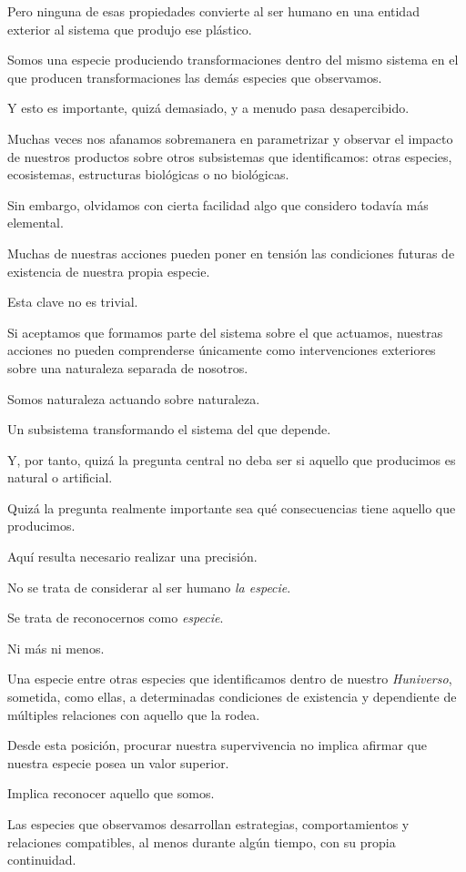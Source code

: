 \documentclass[12pt,a4paper]{article}
\begin{document}
Pero ninguna de esas propiedades convierte al ser humano en una entidad exterior al sistema que produjo ese plástico.

Somos una especie produciendo transformaciones dentro del mismo sistema en el que producen transformaciones las demás especies que observamos.

Y esto es importante, quizá demasiado, y a menudo pasa desapercibido.

Muchas veces nos afanamos sobremanera en parametrizar y observar el impacto de nuestros productos sobre otros subsistemas que identificamos: otras especies, ecosistemas, estructuras biológicas o no biológicas.

Sin embargo, olvidamos con cierta facilidad algo que considero todavía más elemental.

Muchas de nuestras acciones pueden poner en tensión las condiciones futuras de existencia de nuestra propia especie.

Esta clave no es trivial.

Si aceptamos que formamos parte del sistema sobre el que actuamos, nuestras acciones no pueden comprenderse únicamente como intervenciones exteriores sobre una naturaleza separada de nosotros.

Somos naturaleza actuando sobre naturaleza.

Un subsistema transformando el sistema del que depende.

Y, por tanto, quizá la pregunta central no deba ser si aquello que producimos es natural o artificial.

Quizá la pregunta realmente importante sea qué consecuencias tiene aquello que producimos.

Aquí resulta necesario realizar una precisión.

No se trata de considerar al ser humano \emph{la especie}.

Se trata de reconocernos como \emph{especie}.

Ni más ni menos.

Una especie entre otras especies que identificamos dentro de nuestro \emph{Huniverso}, sometida, como ellas, a determinadas condiciones de existencia y dependiente de múltiples relaciones con aquello que la rodea.

Desde esta posición, procurar nuestra supervivencia no implica afirmar que nuestra especie posea un valor superior.

Implica reconocer aquello que somos.

Las especies que observamos desarrollan estrategias, comportamientos y relaciones compatibles, al menos durante algún tiempo, con su propia continuidad.
\end{document}
